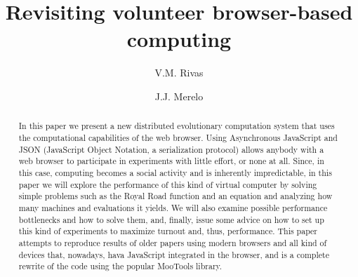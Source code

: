 \documentclass{llncs}
\begin{document}

\title{Revisiting volunteer browser-based computing}

\author{V.M. Rivas  \and J.J. Merelo }
\maketitle

\begin{abstract}
In this paper we present a new distributed
 evolutionary computation system that uses the computational capabilities of the
 web browser. Using 
Asynchronous JavaScript and JSON (JavaScript Object Notation, a
 serialization protocol) allows anybody with a web browser to participate in experiments with little effort, or none at all. Since, in
this case, computing becomes a social activity and is inherently
impredictable, in this
 paper we will explore the performance of this kind of virtual
 computer by solving simple problems such as the
 Royal Road function and an equation and analyzing how many machines and evaluations
it yields. We will also examine possible performance bottlenecks
 and how to solve them, and, finally, issue some advice on how to set
 up this kind of experiments to maximize turnout and, thus,
 performance. This paper attempts to reproduce results of older papers
 using modern browsers and all kind of devices that, nowadays, hava
 JavaScript integrated in the browser, and is a complete rewrite of
 the code using the popular MooTools library. %
\end{abstract}

\end{document}
